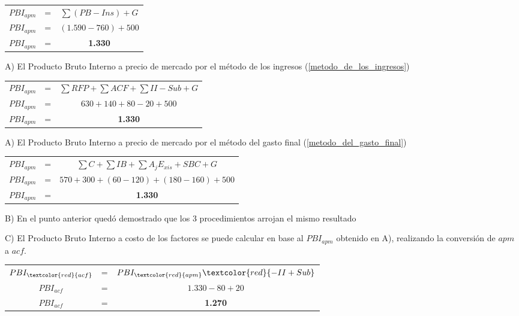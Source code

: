 \documentclass[12pt,a4paper]{article}
\begin{document}
		\begin{table}[H]
		\centering
        	\begin{tabular}{ c c c }
               	$ PBI_{apm} $ &=& $ \sum ( PB - Ins ) + G $ \\
                $ PBI_{apm} $ &=& $ ( 1{.}590 - 760 ) + 500 $ \\
                $ PBI_{apm} $ &=& \textbf{1.330}
			\end{tabular}
		\end{table}
        
        A) El Producto Bruto Interno a precio de mercado por el método de los ingresos (\ref{metodo_de_los_ingresos})
        
		\begin{table}[H]
		\centering
        	\begin{tabular}{ c c c }
               	$ PBI_{apm} $ &=& $ \sum RFP + \sum ACF + \sum II - Sub + G $ \\
                $ PBI_{apm} $ &=& $ 630 + 140 + 80 - 20 + 500 $ \\
                $ PBI_{apm} $ &=& \textbf{1.330}
			\end{tabular}
		\end{table}
        
        A) El Producto Bruto Interno a precio de mercado por el método del gasto final (\ref{metodo_del_gasto_final})
        
		\begin{table}[H]
		\centering
        	\begin{tabular}{ c c c }
               	$ PBI_{apm} $ &=& $ \sum C + \sum IB + \sum {A}_{j} {E}_{xis} + SBC + G $ \\
                $ PBI_{apm} $ &=& $ 570 + 300 + ( 60 - 120 ) + ( 180 - 160 ) + 500 $ \\
                $ PBI_{apm} $ &=& \textbf{1.330}
			\end{tabular}
		\end{table}
        
        \hrulefill
        
        B) En el punto anterior quedó demostrado que los 3 procedimientos arrojan el mismo resultado
        
        \newpage
        
        C) El Producto Bruto Interno a costo de los factores se puede calcular en base al $PBI_{apm}$ obtenido en A), realizando la conversión de $apm$ a $acf$.
        
		\begin{table}[H]
		\centering
        	\begin{tabular}{ c c c }
               	$ PBI_{\textcolor{red}{acf}} $ &=& $ PBI_{\textcolor{red}{apm}} \textcolor{red}{- II + Sub} $ \\
                $ PBI_{acf} $ &=& $ 1{.}330 - 80 + 20 $ \\
                $ PBI_{acf} $ &=& \textbf{1.270}
			\end{tabular}
		\end{table}
        
\end{document}
